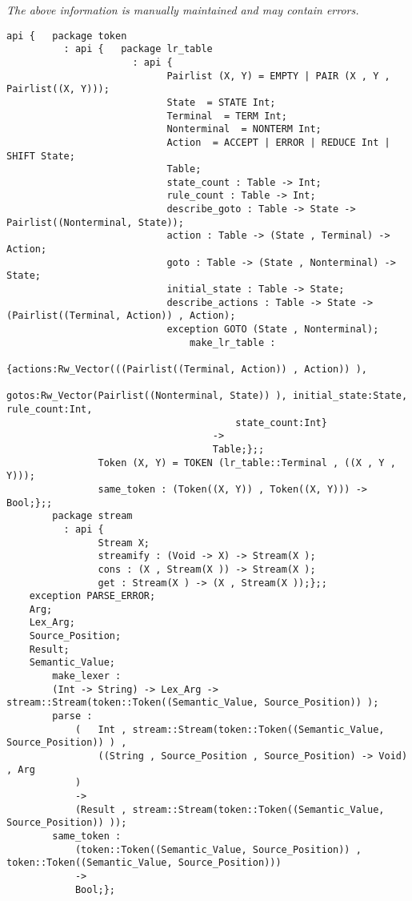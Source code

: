 \label{api:Arg\_Parser}

{\tiny \it The above information is manually maintained and may contain errors.}
\begin{verbatim}
api {   package token
          : api {   package lr_table
                      : api {
                            Pairlist (X, Y) = EMPTY | PAIR (X , Y , Pairlist((X, Y)));
                            State  = STATE Int;
                            Terminal  = TERM Int;
                            Nonterminal  = NONTERM Int;
                            Action  = ACCEPT | ERROR | REDUCE Int | SHIFT State;
                            Table;
                            state_count : Table -> Int;
                            rule_count : Table -> Int;
                            describe_goto : Table -> State -> Pairlist((Nonterminal, State));
                            action : Table -> (State , Terminal) -> Action;
                            goto : Table -> (State , Nonterminal) -> State;
                            initial_state : Table -> State;
                            describe_actions : Table -> State -> (Pairlist((Terminal, Action)) , Action);
                            exception GOTO (State , Nonterminal);
                                make_lr_table :
                                        {actions:Rw_Vector(((Pairlist((Terminal, Action)) , Action)) ),
                                        gotos:Rw_Vector(Pairlist((Nonterminal, State)) ), initial_state:State, rule_count:Int,
                                        state_count:Int}
                                    ->
                                    Table;};;
                Token (X, Y) = TOKEN (lr_table::Terminal , ((X , Y , Y)));
                same_token : (Token((X, Y)) , Token((X, Y))) -> Bool;};;
        package stream
          : api {
                Stream X;
                streamify : (Void -> X) -> Stream(X );
                cons : (X , Stream(X )) -> Stream(X );
                get : Stream(X ) -> (X , Stream(X ));};;
    exception PARSE_ERROR;
    Arg;
    Lex_Arg;
    Source_Position;
    Result;
    Semantic_Value;
        make_lexer :
        (Int -> String) -> Lex_Arg -> stream::Stream(token::Token((Semantic_Value, Source_Position)) );
        parse :
            (   Int , stream::Stream(token::Token((Semantic_Value, Source_Position)) ) ,
                ((String , Source_Position , Source_Position) -> Void) , Arg
            )
            ->
            (Result , stream::Stream(token::Token((Semantic_Value, Source_Position)) ));
        same_token :
            (token::Token((Semantic_Value, Source_Position)) , token::Token((Semantic_Value, Source_Position)))
            ->
            Bool;};
\end{verbatim}
